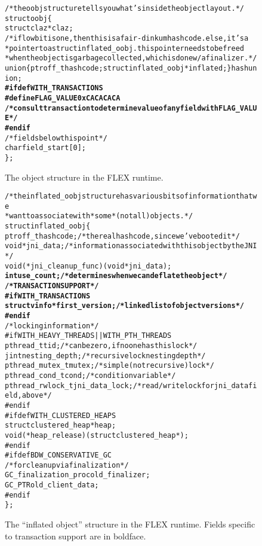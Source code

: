\documentclass[11pt,notitlepage]{article}
\newcommand{\codesize}{\scriptsize}
\begin{document}
\begin{figure}
\begin{alltt}\codesize
/* the oobj structure tells you what's inside the object layout. */
struct oobj \{
  struct claz *claz;
  /* if low bit is one, then this is a fair-dinkum hashcode. else, it's a
   * pointer to a struct inflated_oobj. this pointer needs to be freed
   * when the object is garbage collected, which is done w/ a finalizer. */
  union \{ ptroff_t hashcode; struct inflated_oobj *inflated; \} hashunion;
\textbf{#ifdef WITH_TRANSACTIONS
#define FLAG_VALUE 0xCACACACA
  /* consult transaction to determine value of any field with FLAG_VALUE */
#endif}
  /* fields below this point */
  char field_start[0];
\};
\end{alltt}
\caption{The object structure in the FLEX runtime.}
\label{fig:oobj}
\end{figure}
\begin{figure}
\begin{alltt}\codesize
/* the inflated_oobj structure has various bits of information that we
 * want to associate with *some* (not all) objects. */
struct inflated_oobj \{
  ptroff_t hashcode; /* the real hashcode, since we've booted it */
  void *jni_data; /* information associated with this object by the JNI */
  void (*jni_cleanup_func)(void *jni_data);
\textbf{  int use_count; /* determines when we can deflate the object */
  /* TRANSACTION SUPPORT */
#if WITH_TRANSACTIONS
  struct vinfo *first_version; /* linked list of object versions */
#endif}
  /* locking information */
#if WITH_HEAVY_THREADS || WITH_PTH_THREADS
  pthread_t tid; /* can be zero, if no one has this lock */
  jint nesting_depth; /* recursive lock nesting depth */
  pthread_mutex_t mutex; /* simple (not recursive) lock */
  pthread_cond_t  cond; /* condition variable */
  pthread_rwlock_t jni_data_lock; /*read/write lock for jni_data field, above*/
#endif
#ifdef WITH_CLUSTERED_HEAPS
  struct clustered_heap * heap;
  void (*heap_release)(struct clustered_heap *);
#endif
#ifdef BDW_CONSERVATIVE_GC
  /* for cleanup via finalization */
  GC_finalization_proc old_finalizer;
  GC_PTR old_client_data;
#endif
\};
\end{alltt}
\caption{The ``inflated object'' structure in the FLEX runtime.
         Fields specific to transaction support are in boldface.}
\label{fig:infl}
\end{figure}
\end{document}
